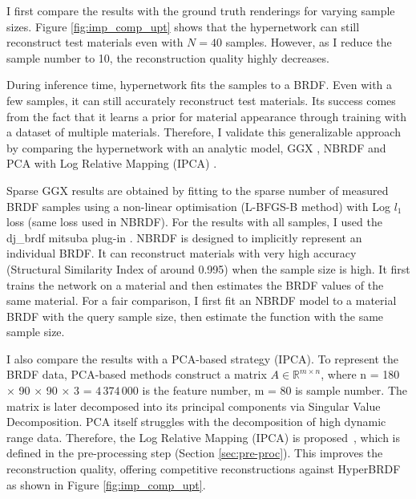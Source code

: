 I first compare the results with the ground truth renderings for varying sample sizes. Figure \ref{fig:imp_comp_upt} shows that the hypernetwork can still reconstruct test materials even with $N = 40$ samples. However, as I reduce the sample number to 10, the reconstruction quality highly decreases. 

During inference time, hypernetwork fits the samples to a BRDF. Even with a few samples, it can still accurately reconstruct test materials. Its success comes from the fact that it learns a prior for material appearance through training with a dataset of multiple materials. Therefore, I validate this generalizable approach by comparing the hypernetwork with an analytic model, GGX  \cite{walter2007microfacet}, NBRDF \cite{sztrajman2021neural} and PCA with Log Relative Mapping (IPCA) \cite{nielsen2015optimal}.

Sparse GGX results are obtained by fitting to the sparse number of measured BRDF samples using a non-linear optimisation (L-BFGS-B method) with Log $l_1$ loss (same loss used in NBRDF). For the results with all samples, I used the dj\_brdf mitsuba plug-in \cite{dupuy2015photorealistic}. NBRDF \cite{sztrajman2021neural} is designed to implicitly represent an individual BRDF. It can reconstruct materials with very high accuracy (Structural Similarity Index of around 0.995) when the sample size is high. It first trains the network on a material and then estimates the BRDF values of the same material. For a fair comparison, I first fit an NBRDF model to a material BRDF with the query sample size, then estimate the function with the same sample size. 

I also compare the results with a PCA-based strategy (IPCA). To represent the BRDF data, PCA-based methods  \cite{matusik2003data, ngan2006image} construct a matrix ${A} \in \mathbb{R}^{m \times n}$, where n = 180 × 90 × 90 × 3 = $4\,374\,000$ is the feature number, m = 80 is sample number. The matrix is later decomposed into its principal components via Singular Value Decomposition. PCA itself struggles with the decomposition of high dynamic range data. Therefore, the Log Relative Mapping (IPCA) is proposed~\cite{nielsen2015optimal}, which is defined in the pre-processing step (Section \ref{sec:pre-proc}). This improves the reconstruction quality, offering competitive reconstructions against HyperBRDF as shown in Figure \ref{fig:imp_comp_upt}.


